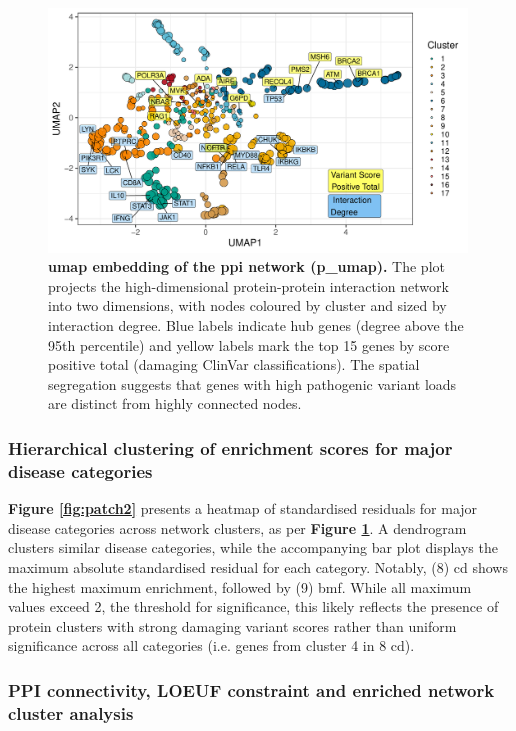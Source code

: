\begin{figure}[ht]
  \centering
  \includegraphics[width=0.99\textwidth]{../images/untangleR_ppi_network_umap.pdf}
  \caption{
    \textbf{\ac{umap} embedding of the \ac{ppi} network (p\_umap).} 
    The plot projects the high-dimensional protein-protein interaction network into two dimensions, with nodes coloured by cluster and sized by interaction degree. Blue labels indicate hub genes (degree above the 95th percentile) and yellow labels mark the top 15 genes by score positive total (damaging ClinVar classifications). The spatial segregation suggests that genes with high pathogenic variant loads are distinct from highly connected nodes.
  }
  \label{fig:p_umap}
\end{figure}

\FloatBarrier
\subsubsection{Hierarchical clustering of enrichment scores for major disease categories}
\textbf{Figure \ref{fig:patch2}} presents a heatmap of standardised residuals for major disease categories across network clusters, as per \textbf{Figure \ref{fig:p_umap}}. 
A dendrogram clusters similar disease categories, while the accompanying bar plot displays the maximum absolute standardised residual for each category.
Notably, (8) \ac{cd} shows the highest maximum enrichment, followed by 
(9) \ac{bmf}. 
While all maximum values exceed 2, the threshold for significance, this likely reflects the presence of protein clusters with strong damaging variant scores rather than uniform significance across all categories (i.e. genes from cluster 4 in 8 \ac{cd}).


\subsubsection{PPI connectivity, LOEUF constraint and enriched network cluster analysis}

